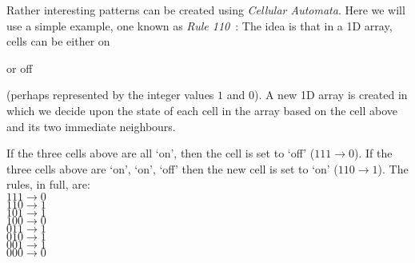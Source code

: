 


Rather interesting patterns can be created using
{\it Cellular Automata}. Here we will use a simple
example, one known as {\it Rule 110}~:
The idea is that in a 1D array, cells can be either
on
or off
(perhaps represented by the integer values
$1$ and $0$).
A new 1D array is created in which we decide upon the
state of each cell in the array based on the cell above
and its two immediate neighbours.

If the three cells above are all `on', then the cell is set
to `off' ($111 \rightarrow 0$). If the three cells above
are `on', `on', `off' then the new cell is set to `on' ($110 \rightarrow 1$).
The rules, in full, are:\\
$111 \rightarrow 0$\\
$110 \rightarrow 1$\\
$101 \rightarrow 1$\\
$100 \rightarrow 0$\\
$011 \rightarrow 1$\\
$010 \rightarrow 1$\\
$001 \rightarrow 1$\\
$000 \rightarrow 0$\\


